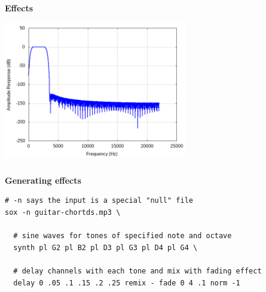 \documentclass[usenames,dvipsnames, 18pt, compress, aspectratio=169]{beamer}
\begin{document}
\begin{frame}[fragile]{}
    \frametitle{}
    \begin{center}
        \textbf{Effects}
        \vspace{0.2cm}

        \includegraphics[width=0.6\textwidth]{phone.png}

    \end{center}
\end{frame}

\begin{frame}[fragile]{}
    \frametitle{}
    \begin{center}
        \textbf{Generating effects}
        \vspace{0.2cm}

        \begin{verbatim}
# -n says the input is a special "null" file
sox -n guitar-chortds.mp3 \

  # sine waves for tones of specified note and octave
  synth pl G2 pl B2 pl D3 pl G3 pl D4 pl G4 \

  # delay channels with each tone and mix with fading effect
  delay 0 .05 .1 .15 .2 .25 remix - fade 0 4 .1 norm -1
        \end{verbatim}

    \end{center}
\end{frame}
\end{document}
